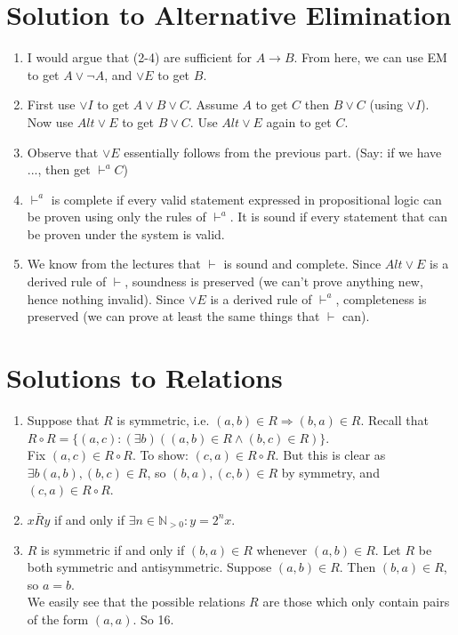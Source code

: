\documentclass[10pt,a4paper]{article}
\begin{document}
\section{Solution to Alternative Elimination}
\begin{enumerate}
	\item I would argue that (2-4) are sufficient for \(A \rightarrow B\).
	From here, we can use EM to get \( A \lor \neg A\), and \(\lor E\) to get \(B\).
	\item First use \(\lor I\) to get \( A \lor B \lor C\). Assume \(A\) to get \(C\) then \(B \lor C\) (using \(\lor I\)). Now use \(Alt\lor E\) to get \(B \lor C\). Use \(Alt\lor E\) again to get \(C\).
	\item Observe that \(\lor E\) essentially follows from the previous part. (Say: if we have ..., then get \(\vdash^a C\))
	\item \(\vdash^a\) is complete if every valid statement expressed in propositional logic can be proven using only the rules of \(\vdash^a\).
	It is sound if every statement that can be proven under the system is valid.
	\item We know from the lectures that \(\vdash\) is sound and complete.
	Since \(Alt\lor E\) is a derived rule of \(\vdash\), soundness is preserved (we can't prove anything new, hence nothing invalid).
	Since \(\lor E\) is a derived rule of \(\vdash^a\), completeness is preserved (we can prove at least the same things that \(\vdash\) can).
\end{enumerate}


\section{Solutions to Relations}
\begin{enumerate}
	\item Suppose that \(R\) is symmetric, i.e. \( (a, b) \in R \Rightarrow (b,a) \in R \). Recall that \( R \circ R = \{ (a,c) : (\exists b) \left( (a,b) \in R \land (b,c) \in R \right) \} \). \\
	Fix \( (a,c) \in R \circ R \). To show: \( (c,a) \in R \circ R \). But this is clear as \( \exists b (a,b), (b,c) \in R \), so \( (b,a), (c,b) \in R \) by symmetry, and \( (c,a) \in R \circ R\).
	\item \(x \bar R y\) if and only if \(\exists n \in \mathbb{N}_{>0} : y = 2^n x \).
	\item \(R\) is symmetric if and only if \( (b,a) \in R \) whenever \( (a,b) \in R \). Let \(R\) be both symmetric and antisymmetric. Suppose \( (a,b) \in R \). Then \( (b,a) \in R \), so \(a=b\). \\
	We easily see that the possible relations \(R\) are those which only contain pairs of the form \( (a,a) \). So 16.
\end{enumerate}
\end{document}
